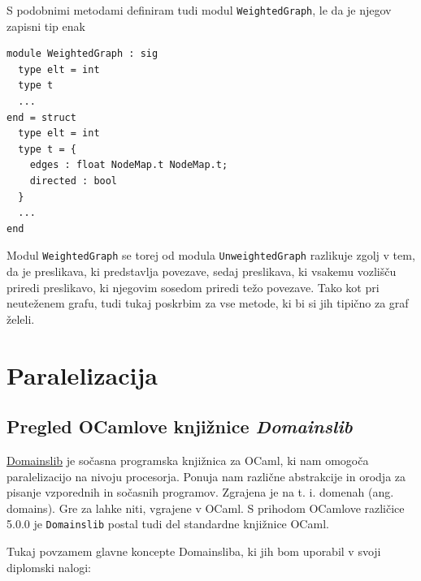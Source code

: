 \documentclass[mat1, tisk]{fmfdelo}
\begin{document}
S podobnimi metodami definiram tudi modul \texttt{WeightedGraph}, le da je njegov zapisni
tip enak
\begin{lstlisting}
module WeightedGraph : sig
  type elt = int
  type t
  ...
end = struct
  type elt = int
  type t = {
    edges : float NodeMap.t NodeMap.t; 
    directed : bool
  }
  ...
end
\end{lstlisting}

Modul \texttt{WeightedGraph} se torej od modula \texttt{UnweightedGraph} razlikuje zgolj v tem, da je preslikava, ki
predstavlja povezave, sedaj preslikava, ki vsakemu vozlišču priredi preslikavo, ki njegovim sosedom priredi težo povezave.
Tako kot pri neuteženem grafu, tudi tukaj poskrbim za vse metode, ki bi si jih tipično za graf želeli.

\section{Paralelizacija}

\subsection{Pregled OCamlove knjižnice \textit{Domainslib}} \label{sec:pregled_domainslib}

\href{https://github.com/ocaml-multicore/domainslib}{Domainslib} je sočasna programska knjižnica za OCaml, 
ki nam omogoča paralelizacijo na nivoju procesorja. Ponuja nam različne abstrakcije in orodja za pisanje vzporednih
in sočasnih programov. Zgrajena je na t. i. domenah (ang. domains). Gre za lahke niti, vgrajene v OCaml.
S prihodom OCamlove različice 5.0.0 je \texttt{Domainslib} postal tudi del standardne knjižnice OCaml.

Tukaj povzamem glavne koncepte Domainsliba, ki jih bom uporabil v svoji diplomski nalogi:
\end{document}
